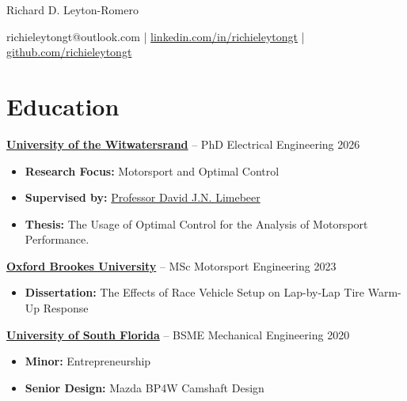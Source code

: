 \documentclass[12pt,letterpaper]{article} %
\begin{document}
\centerline{\Huge{Richard D. Leyton-Romero}}

\vspace{5pt} %

\centerline{{richieleytongt@outlook.com} | \href{https://www.linkedin.com/in/richieleytongt/}{linkedin.com/in/richieleytongt} | \href{https://github.com/richieleytongt}{github.com/richieleytongt}}

\vspace{-6.5pt} %

\section*{Education}

\textbf{\href{https://www.wits.ac.za/eie/}{University of the Witwatersrand}} -- PhD Electrical Engineering \hfill 2026 \\
\vspace{-9pt}
\begin{itemize}[itemsep=-4pt]
    \item \textbf{Research Focus:} Motorsport and Optimal Control
    \item \textbf{Supervised by:} \href{https://www.nrf.ac.za/about-us/nrf-awards/2022-2/a-rated-researchers-2022/professor-david-j-n-limebeer/}{Professor David J.N. Limebeer}
    \item \textbf{Thesis:} The Usage of Optimal Control for the Analysis of Motorsport Performance.
\end{itemize}

\vspace{-5pt}
\textbf{\href{https://www.brookes.ac.uk/courses/postgraduate/motorsport-engineering-msc}{Oxford Brookes University}} -- MSc Motorsport Engineering \hfill 2023 \\
\vspace{-9pt}
\begin{itemize}[itemsep =-4pt]
    \item \textbf{Dissertation:} The Effects of Race Vehicle Setup on Lap-by-Lap Tire Warm-Up Response
\end{itemize}

\vspace{-5pt}
\textbf{\href{https://www.usf.edu/engineering/me/}{University of South Florida}} -- BSME Mechanical Engineering \hfill 2020 \\
\vspace{-9pt}
\begin{itemize}[itemsep = -4pt]
    \item \textbf{Minor:} Entrepreneurship
    \item \textbf{Senior Design:} Mazda BP4W Camshaft Design
\end{itemize}
\end{document}
